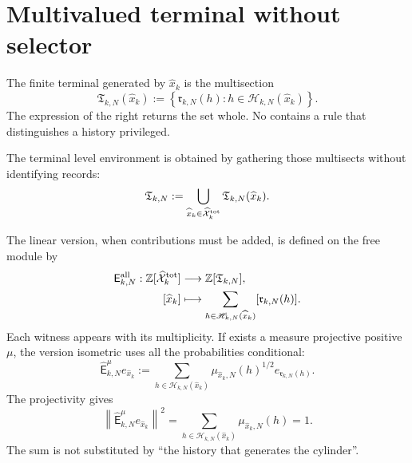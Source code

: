 \section{Multivalued terminal without selector}

The finite terminal generated by \(\widehat x_k\) is the multisection
\begin{equation}
\label{eq:pdfv2-terminal-multivaluado}
 \mathfrak T_{k,N}(\widehat x_k)
 :=\left\{\mathfrak r_{k,N}(h):
            h\in\mathscr H_{k,N}(\widehat x_k)\right\}.
\end{equation}
The expression of the right returns the set whole. No contains a
rule that distinguishes a history privileged.

The terminal level environment is obtained by gathering those multisects without
identifying records:
\begin{equation}
\label{eq:pdfv2-terminal-ambiente-nivel}
 \mathfrak T_{k,N}
 :=\bigcup_{\widehat x_k\in\widehat{\mathcal X}^{\rm tot}_k}
   \mathfrak T_{k,N}(\widehat x_k).
\end{equation}

The linear version, when contributions must be added, is defined on
the free module by
\begin{equation}
\label{eq:pdfv2-terminal-evaluacion-todas}
 \begin{aligned}
 \mathsf E_{k,N}^{\rm all}:
 \mathbb Z[\widehat{\mathcal X}^{\rm tot}_k]&\longrightarrow
 \mathbb Z[\mathfrak T_{k,N}],\\
 [\widehat x_k]&\longmapsto
 \sum_{h\in\mathscr H_{k,N}(\widehat x_k)}
 [\mathfrak r_{k,N}(h)].
 \end{aligned}
\end{equation}
Each witness appears with its multiplicity. If exists a measure projective
positive \(\mu\), the version isometric uses all the probabilities
conditional:
\begin{equation}
\label{eq:pdfv2-terminal-evaluacion-ponderada}
 \widehat{\mathsf E}_{k,N}^{\mu}e_{\widehat x_k}
 :=\sum_{h\in\mathscr H_{k,N}(\widehat x_k)}
 \mu_{\widehat x_k,N}(h)^{1/2}
 e_{\mathfrak r_{k,N}(h)}.
\end{equation}
The projectivity gives
\begin{equation}
\label{eq:pdfv2-terminal-isometria}
 \left\|\widehat{\mathsf E}_{k,N}^{\mu}e_{\widehat x_k}\right\|^2
 =\sum_{h\in\mathscr H_{k,N}(\widehat x_k)}
   \mu_{\widehat x_k,N}(h)=1.
\end{equation}
The sum is not substituted by ``the history that generates the cylinder''.

